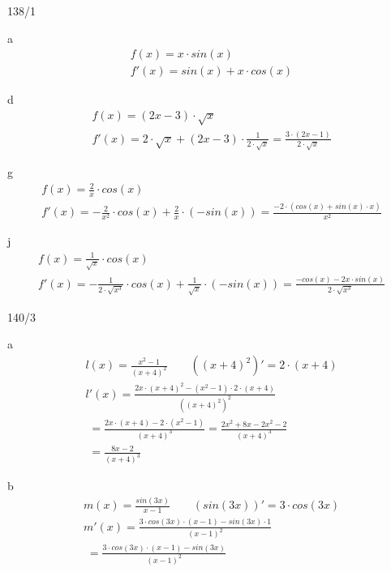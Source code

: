 \begin{exercise}{138/1}
  \item [a]
  \begin{gather*}
    f(x) = x \cdot sin(x) \\
    f'(x) = sin(x) + x \cdot cos(x)
  \end{gather*}
  \item [d]
  \begin{gather*}
    f(x) = (2x - 3) \cdot \sqrt{x} \\
    f'(x) = 2 \cdot \sqrt{x} + (2x - 3) \cdot \frac{1}{2 \cdot \sqrt{x}} = \frac{3 \cdot (2x - 1)}{2 \cdot \sqrt{x}}
  \end{gather*}
  \item [g]
  \begin{gather*}
    f(x) = \frac{2}{x} \cdot cos(x) \\
    f'(x) = -\frac{2}{x^2} \cdot cos(x) + \frac{2}{x} \cdot (-sin(x)) = \frac{-2 \cdot (cos(x) + sin(x) \cdot x)}{x^2}
  \end{gather*}
  \item [j]
  \begin{gather*}
    f(x) = \frac{1}{\sqrt{x}} \cdot cos(x) \\
    f'(x) = -\frac{1}{2 \cdot \sqrt{x^3}} \cdot cos(x) + \frac{1}{\sqrt{x}} \cdot (-sin(x)) = \frac{-cos(x) - 2x \cdot sin(x)}{2 \cdot \sqrt{x^3}}
  \end{gather*}
\end{exercise}
\begin{exercise}{140/3}
  \item [a]
  \begin{gather*}
    l(x) = \frac{x^2 - 1}{(x + 4)^2} \qquad ((x + 4)^2)' = 2 \cdot (x + 4) \\
    l'(x) = \frac{2x \cdot (x + 4)^2 - (x^2 - 1) \cdot 2 \cdot (x + 4)}{((x + 4)^2)^2} \\
    \;= \frac{2x \cdot (x + 4) - 2 \cdot (x^2 - 1)}{(x + 4)^3} = \frac{2x^2 + 8x - 2x^2 - 2}{(x + 4)^3} \\
    \;= \frac{8x - 2}{(x + 4)^3}
  \end{gather*}
  \item [b]
  \begin{gather*}
    m(x) = \frac{sin(3x)}{x - 1} \qquad (sin(3x))' = 3 \cdot cos(3x) \\
    m'(x) = \frac{3 \cdot cos(3x) \cdot (x - 1) - sin(3x) \cdot 1}{(x - 1)^2} \\
    \;= \frac{3 \cdot cos(3x) \cdot (x - 1) - sin(3x)}{(x - 1)^2}
  \end{gather*}
\end{exercise}
